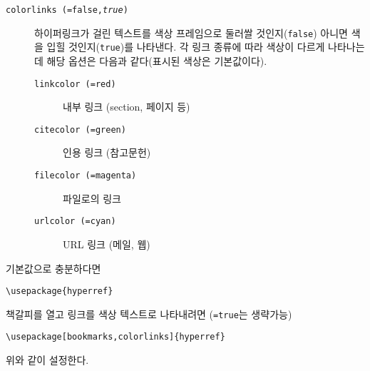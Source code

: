 \begin{description}
\item [\texttt{colorlinks (=false,\textit{true})}] 하이퍼링크가 걸린 텍스트를 색상 프레임으로 둘러쌀 것인지(\texttt{false}) 아니면 색을 입힐 것인지(\texttt{true})를 나타낸다. 각 링크 종류에 따라 색상이 다르게 나타나는데 해당 옵션은 다음과 같다(표시된 색상은 기본값이다).
  \begin{description}
    \item [\texttt{linkcolor (=red)}] 내부 링크 (section, 페이지 등)
    \item [\texttt{citecolor (=green)}] 인용 링크 (참고문헌)
    \item [\texttt{filecolor (=magenta)}] 파일로의 링크
    \item [\texttt{urlcolor (=cyan)}] URL 링크 (메일, 웹)
  \end{description}
\end{description}


기본값으로 충분하다면
\begin{code}
\begin{verbatim}
\usepackage{hyperref}
\end{verbatim}
\end{code}

\noindent 책갈피를 열고 링크를 색상 텍스트로 나타내려면 (\texttt{=true}는 생략가능)
\begin{code}
\begin{verbatim}
\usepackage[bookmarks,colorlinks]{hyperref}
\end{verbatim}
\end{code}
\noindent 위와 같이 설정한다.

